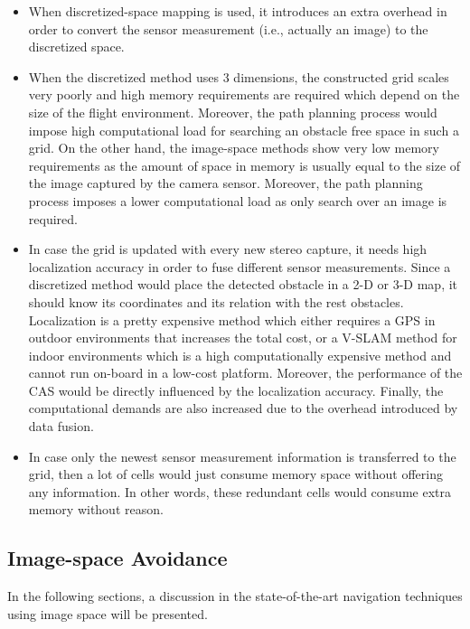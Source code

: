 \begin{itemize}
	\item When discretized-space mapping is used, it introduces an extra overhead in order to convert the sensor measurement (i.e., actually an image) to the discretized space.
	\item When the discretized method uses 3 dimensions, the constructed grid scales very poorly and high memory requirements are required which depend on the size of the flight environment. Moreover, the path planning process would impose high computational load for searching an obstacle free space in such a grid. On the other hand, the image-space methods show very low memory requirements as the amount of space in memory is usually equal to the size of the image captured by the camera sensor. Moreover, the path planning process imposes a lower computational load as only search over an image is required.
	\item In case the grid is updated with every new stereo capture, it needs high localization accuracy in order to fuse different sensor measurements. Since a discretized method would place the detected obstacle in a 2-D or 3-D map, it should know its coordinates and its relation with the rest obstacles. Localization is a pretty expensive method which either requires a GPS in outdoor environments that increases the total cost, or a V-SLAM method for indoor environments which is a high computationally expensive method and cannot run on-board in a low-cost platform. Moreover, the performance of the \ac{CAS} would be directly influenced by the localization accuracy. Finally, the computational demands are also increased due to the overhead introduced by data fusion.
	\item In case only the newest sensor measurement information is transferred to the grid, then a lot of cells would just consume memory space without offering any information. In other words, these redundant cells would consume extra memory without reason.
\end{itemize}


\subsection{Image-space Avoidance}
\label{ch:literature:state_of_the_art_avoidance:reactive_image_navigation}

In the following sections, a discussion in the state-of-the-art navigation techniques using image space will be presented.

